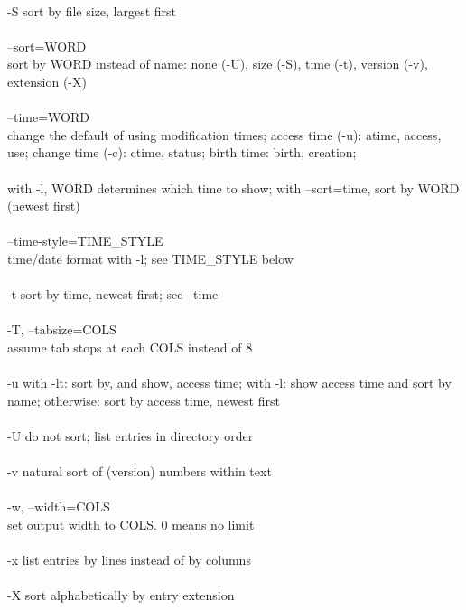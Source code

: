 \documentclass{article}
\begin{document}
\\
       -S     sort by file size, largest first \\
\\
       --sort=WORD \\
              sort  by  WORD instead of name: none (-U), size (-S), time (-t),
              version (-v), extension (-X) \\
\\
       --time=WORD \\
              change the default of  using  modification  times;  access  time
              (-u): atime, access, use; change time (-c): ctime, status; birth
              time: birth, creation; \\
\\
              with -l, WORD determines which time to show;  with  --sort=time,
              sort by WORD (newest first) \\
\\
       --time-style=TIME_STYLE \\
              time/date format with -l; see TIME_STYLE below \\
\\
       -t     sort by time, newest first; see --time \\
\\
       -T, --tabsize=COLS \\
              assume tab stops at each COLS instead of 8 \\
\\
       -u     with  -lt:  sort by, and show, access time; with -l: show access
              time and sort by name; otherwise: sort by  access  time,  newest
              first \\
\\
       -U     do not sort; list entries in directory order \\
\\
       -v     natural sort of (version) numbers within text \\
\\
       -w, --width=COLS \\
              set output width to COLS.  0 means no limit \\
\\
       -x     list entries by lines instead of by columns \\
\\
       -X     sort alphabetically by entry extension \\
\\
\end{document}
